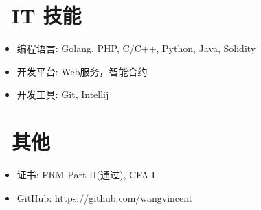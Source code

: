 \documentclass{resume}
\begin{document}

\section{\faCogs\ IT 技能}
\begin{itemize}[parsep=0.5ex]
  \item 编程语言: Golang, PHP, C/C++, Python, Java, Solidity
  \item 开发平台: Web服务，智能合约
  \item 开发工具: Git, Intellij
\end{itemize}

\section{\faInfo\ 其他}
\begin{itemize}[parsep=0.5ex]
  \item 证书: FRM Part II(通过), CFA I
  \item GitHub: https://github.com/wangvincent
\end{itemize}

%
%
\end{document}
